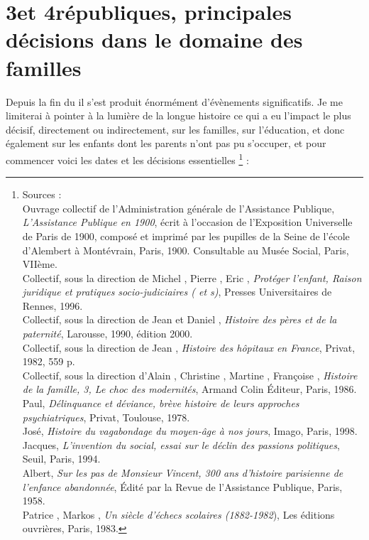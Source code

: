 
\chapter{3\ieme et 4\ieme républiques, principales décisions dans le domaine des familles}


 Depuis la fin du  il s'est produit énormément d'évènements significatifs. Je me limiterai à pointer à la lumière de la longue histoire ce qui a eu l'impact le plus décisif, directement ou indirectement, sur les familles, sur l'éducation, et donc également sur les enfants dont les parents n'ont pas pu s'occuper, et pour commencer voici les dates et les décisions essentielles%
\footnote{Sources :
\\Ouvrage collectif de l'Administration générale de l'Assistance Publique, \emph{L'Assistance Publique en 1900}, écrit à l'occasion de l'Exposition Universelle de Paris de 1900, composé et imprimé par les pupilles de la Seine de l'école d'Alembert à Montévrain, Paris, 1900. Consultable au Musée Social, Paris, VIIème.
\\Collectif, sous la direction de Michel , Pierre , Eric , \emph{Protéger l'enfant, Raison juridique et pratiques socio-judiciaires ( et s)}, Presses Universitaires de Rennes, 1996.
\\Collectif, sous la direction de Jean  et Daniel , \emph{Histoire des pères et de la paternité}, Larousse, 1990, édition 2000.
\\Collectif, sous la direction de Jean , \emph{Histoire des hôpitaux en France}, Privat, 1982, 559 p.
\\Collectif, sous la direction d'Alain , Christine , Martine , Françoise , \emph{Histoire de la famille, 3, Le choc des modernités}, Armand Colin Éditeur, Paris, 1986.
\\ Paul, \emph{Délinquance et déviance, brève histoire de leurs approches psychiatriques}, Privat, Toulouse, 1978.
\\ José, \emph{Histoire du vagabondage du moyen-âge à nos jours}, Imago, Paris, 1998.
\\ Jacques, \emph{L'invention du social, essai sur le déclin des passions politiques}, Seuil, Paris, 1994.
\\ Albert, \emph{Sur les pas de Monsieur Vincent, 300 ans d'histoire parisienne de l'enfance abandonnée}, Édité par la Revue de l'Assistance Publique, Paris, 1958.
\\Patrice {}, Markos , \emph{Un siècle d'échecs scolaires (1882-1982}), Les éditions ouvrières, Paris, 1983.}%
 :


